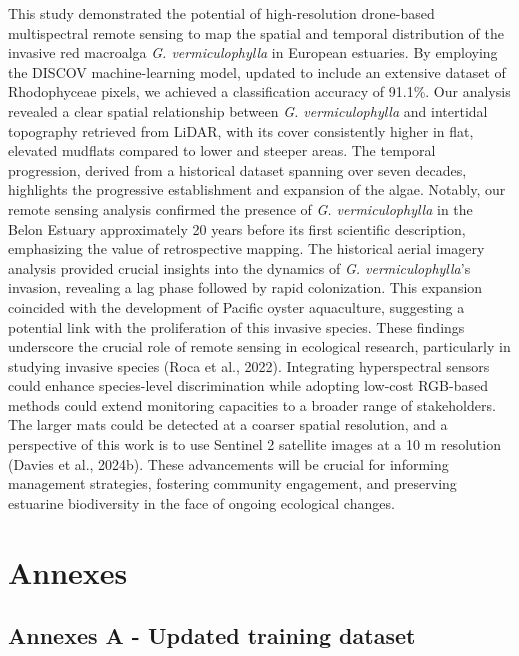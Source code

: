 \documentclass[
  letterpaper,
  11pt,
  english,
  singlespacing,
  headsepline]{MastersDoctoralThesis}
\begin{document}
\begin{spacing}{1.5}
This study demonstrated the potential of high-resolution drone-based
multispectral remote sensing to map the spatial and temporal
distribution of the invasive red macroalga \emph{G. vermiculophylla} in
European estuaries. By employing the DISCOV machine-learning model,
updated to include an extensive dataset of Rhodophyceae pixels, we
achieved a classification accuracy of 91.1\%. Our analysis revealed a
clear spatial relationship between \emph{G. vermiculophylla} and
intertidal topography retrieved from LiDAR, with its cover consistently
higher in flat, elevated mudflats compared to lower and steeper areas.
The temporal progression, derived from a historical dataset spanning
over seven decades, highlights the progressive establishment and
expansion of the algae. Notably, our remote sensing analysis confirmed
the presence of \emph{G. vermiculophylla} in the Belon Estuary
approximately 20 years before its first scientific description,
emphasizing the value of retrospective mapping. The historical aerial
imagery analysis provided crucial insights into the dynamics of \emph{G.
vermiculophylla}'s invasion, revealing a lag phase followed by rapid
colonization. This expansion coincided with the development of Pacific
oyster aquaculture, suggesting a potential link with the proliferation
of this invasive species. These findings underscore the crucial role of
remote sensing in ecological research, particularly in studying invasive
species (Roca et al., 2022). Integrating hyperspectral sensors could
enhance species-level discrimination while adopting low-cost RGB-based
methods could extend monitoring capacities to a broader range of
stakeholders. The larger mats could be detected at a coarser spatial
resolution, and a perspective of this work is to use Sentinel 2
satellite images at a 10 m resolution (Davies et al., 2024b). These
advancements will be crucial for informing management strategies,
fostering community engagement, and preserving estuarine biodiversity in
the face of ongoing ecological changes.

\newpage

\section{Annexes}\label{annexes}

\subsection{Annexes A - Updated training dataset}\label{sec-AnnexeA}


\end{spacing}
\end{document}
